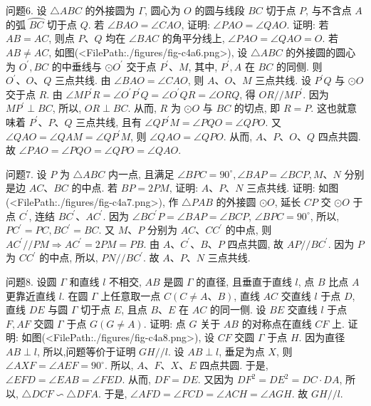 问题6. 设 $\triangle A B C$ 的外接圆为 $\Gamma$, 圆心为 $O$ 的圆与线段 $B C$ 切于点 $P$, 与不含点 $A$ 的弧 $\overparen{B C}$ 切于点 $Q$. 若 $\angle B A O=\angle C A O$, 证明: $\angle P A O=\angle Q A O$.
证明: 若 $A B=A C$, 则点 $P 、 Q$ 均在 $\angle B A C$ 的角平分线上, $\angle P A O=\angle Q A O=O$. 若 $A B \neq A C$, 如图(<FilePath:./figures/fig-c4a6.png>), 设 $\triangle A B C$ 的外接圆的圆心为 $O^{\prime}, B C$ 的中垂线与 $\odot O^{\prime}$ 交于点 $P^{\prime} 、 M$, 其中, $P^{\prime}, A$ 在 $B C$ 的同侧.
则 $O^{\prime} 、 O 、 Q$ 三点共线.
由 $\angle B A O=\angle C A O$, 则 $A 、 O 、 M$ 三点共线.
设 $P^{\prime} Q$ 与 $\odot O$ 交于点 $R$. 由 $\angle M P^{\prime} R=\angle O^{\prime} P^{\prime} Q= \angle O^{\prime} Q R=\angle O R Q$, 得 $O R / / M P^{\prime}$. 因为 $M P^{\prime} \perp B C$, 所以, $O R \perp B C$. 从而, $R$ 为 $\odot O$ 与 $B C$ 的切点, 即 $R=P$. 这也就意味着 $P^{\prime} 、 P 、 Q$ 三点共线, 且有 $\angle Q P^{\prime} M=\angle P Q O=\angle Q P O$. 又 $\angle Q A O=\angle Q A M=\angle Q P^{\prime} M$, 则 $\angle Q A O=\angle Q P O$. 从而, $A 、 P 、 O 、 Q$ 四点共圆.
故 $\angle P A O=\angle P Q O=\angle Q P O=\angle Q A O$.



问题7. 设 $P$ 为 $\triangle A B C$ 内一点, 且满足 $\angle B P C=90^{\circ}, \angle B A P=\angle B C P, M 、 N$ 分别是边 $A C 、 B C$ 的中点.
若 $B P=2 P M$, 证明: $A 、 P 、 N$ 三点共线.
证明: 如图(<FilePath:./figures/fig-c4a7.png>), 作 $\triangle P A B$ 的外接圆 $\odot O$, 延长 $C P$ 交 $\odot O$ 于点 $C^{\prime}$, 连结
$B C^{\prime} 、 A C^{\prime}$. 因为 $\angle B C^{\prime} P=\angle B A P=\angle B C P$, $\angle B P C=90^{\circ}$, 所以, $P C^{\prime}=P C, B C^{\prime}=B C$. 又 $M 、 P$ 分别为 $A C 、 C C^{\prime}$ 的中点, 则 $A C^{\prime} / / P M \Rightarrow A C^{\prime}=2 P M=P B$. 由 $A 、 C^{\prime} 、 B 、 P$ 四点共圆, 故 $A P / / B C^{\prime}$. 因为 $P$ 为 $C C^{\prime}$ 的中点, 所以, $P N / / B C^{\prime}$. 故 $A 、 P 、 N$ 三点共线.



问题8. 设圆 $\Gamma$ 和直线 $l$ 不相交, $A B$ 是圆 $\Gamma$ 的直径, 且垂直于直线 $l$, 点 $B$ 比点 $A$ 更靠近直线 $l$. 在圆 $\Gamma$ 上任意取一点 $C(C \neq A 、 B)$, 直线 $A C$ 交直线 $l$ 于点 $D$, 直线 $D E$ 与圆 $\Gamma$ 切于点 $E$, 且点 $B 、 E$ 在 $A C$ 的同一侧.
设 $B E$ 交直线 $l$ 于点 $F, A F$ 交圆 $\Gamma$ 于点 $G(G \neq A)$. 证明: 点 $G$ 关于 $A B$ 的对称点在直线 $C F$ 上.
证明: 如图(<FilePath:./figures/fig-c4a8.png>), 设 $C F$ 交圆 $\Gamma$ 于点 $H$. 因为直径 $A B \perp l$, 所以,问题等价于证明 $G H / / l$.
设 $A B \perp l$, 垂足为点 $X$, 则 $\angle A X F=\angle A E F= 90^{\circ}$. 所以, $A 、 F 、 X 、 E$ 四点共圆.
于是, $\angle E F D= \angle E A B=\angle F E D$. 从而, $D F=D E$. 又因为 $D F^2= D E^2=D C \cdot D A$, 所以, $\triangle D C F \backsim \triangle D F A$. 于是, $\angle A F D=\angle F C D=\angle A C H=\angle A G H$. 故 $G H / / l$.



